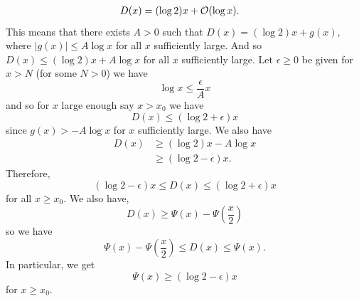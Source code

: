 \documentclass[12pt]{article}
\begin{document}
{\begin{align*}
        D(x)&=(\log2)x+\mathcal{O}(\log x).
    \end{align*}
    This means that there exists $A>0$ such that $D(x)=(\log2)x+g(x),$ where $|g(x)|\leq A\log x$ for all $x$ sufficiently large. And so $D(x)\leq(\log2)x+A\log x$ for all $x$ sufficiently large. Let $\epsilon\geq0$ be given for $x>N$ (for some $N>0$) we have 
    \[
        \log x\leq \frac{\epsilon}{A}x
    \]
    and so for $x$ large enough say $x>x_0$ we have
    \[
        D(x)\leq(\log2+\epsilon)x
    \]
    since $g(x)>-A\log x$ for $x$ sufficiently large. We also have
    \begin{align*}
        D(x)&\geq(\log2)x-A\log x\\
        &\geq(\log2-\epsilon)x.
    \end{align*}
} 
Therefore, 
\[
    (\log2-\epsilon)x\leq D(x)\leq(\log2+\epsilon)x
\]
for all $x\geq x_0$. We also have,
\[
    D(x)\geq\Psi(x)-\Psi\left(\frac{x}{2}\right)
\]
so we have
\[
    \Psi(x)-\Psi\left(\frac{x}{2}\right)\leq D(x)\leq\Psi(x).
\]
In particular, we get
\[
    \Psi(x)\geq(\log2-\epsilon)x
\]
for $x\geq x_0$.
\end{document}
